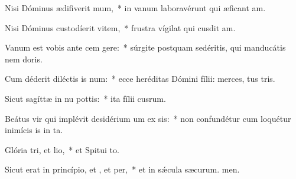 \item Nisi Dóminus ædifiverit mum,~* in vanum laboravérunt qui æficant am.
\item Nisi Dóminus custodíerit vitem,~* frustra vígilat qui cusdit am.
\item Vanum est vobis ante cem gere:~* súrgite postquam sedéritis, qui manducátis nem doris.
\item Cum déderit diléctis is num:~* ecce heréditas Dómini fílii: merces, tus tris.
\item Sicut sagíttæ in nu pottis:~* ita fílii cusrum.
\item Beátus vir qui implévit desidérium um ex sis:~* non confundétur cum loquétur inimícis is in ta.
\item Glória tri, et lio,~* et Spitui to.
\item Sicut erat in princípio, et , et per,~* et in sǽcula sæcurum. men.
